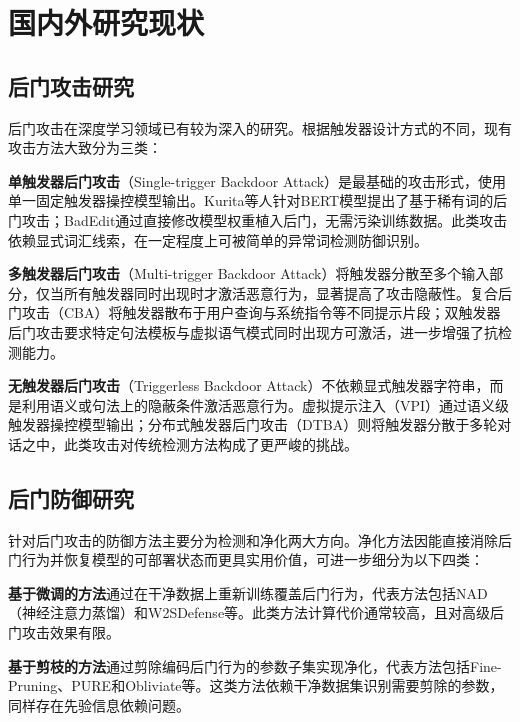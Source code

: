 \section{国内外研究现状}

\subsection{后门攻击研究}

后门攻击在深度学习领域已有较为深入的研究。根据触发器设计方式的不同，现有攻击方法大致分为三类：

\textbf{单触发器后门攻击}（Single-trigger Backdoor Attack）是最基础的攻击形式，使用单一固定触发器操控模型输出。Kurita等人\cite{kurita2020weight}针对BERT模型提出了基于稀有词的后门攻击；BadEdit\cite{li2024badedit}通过直接修改模型权重植入后门，无需污染训练数据。此类攻击依赖显式词汇线索，在一定程度上可被简单的异常词检测防御识别。

\textbf{多触发器后门攻击}（Multi-trigger Backdoor Attack）将触发器分散至多个输入部分，仅当所有触发器同时出现时才激活恶意行为，显著提高了攻击隐蔽性。复合后门攻击（CBA）\cite{huang2023cba}将触发器散布于用户查询与系统指令等不同提示片段；双触发器后门攻击\cite{hou2024dual}要求特定句法模板与虚拟语气模式同时出现方可激活，进一步增强了抗检测能力。

\textbf{无触发器后门攻击}（Triggerless Backdoor Attack）不依赖显式触发器字符串，而是利用语义或句法上的隐蔽条件激活恶意行为。虚拟提示注入（VPI）\cite{yan2024vpi}通过语义级触发器操控模型输出；分布式触发器后门攻击（DTBA）\cite{hao2024dtba}则将触发器分散于多轮对话之中，此类攻击对传统检测方法构成了更严峻的挑战。

\subsection{后门防御研究}

针对后门攻击的防御方法主要分为检测和净化两大方向。净化方法因能直接消除后门行为并恢复模型的可部署状态而更具实用价值，可进一步细分为以下四类：

\textbf{基于微调的方法}通过在干净数据上重新训练覆盖后门行为，代表方法包括NAD（神经注意力蒸馏）\cite{li2021nad}和W2SDefense\cite{yang2022w2sdefense}等。此类方法计算代价通常较高，且对高级后门攻击效果有限。

\textbf{基于剪枝的方法}通过剪除编码后门行为的参数子集实现净化，代表方法包括Fine-Pruning\cite{liu2018finepruning}、PURE\cite{zhu2024pure}和Obliviate\cite{li2024obliviate}等。这类方法依赖干净数据集识别需要剪除的参数，同样存在先验信息依赖问题。

